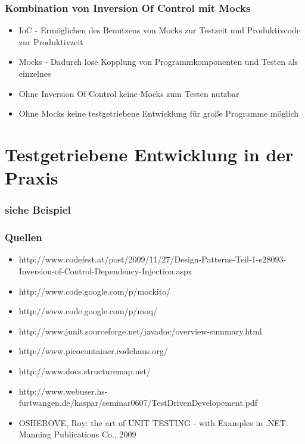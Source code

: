 \documentclass{beamer}
\begin{document}
\begin{frame}
\frametitle{Kombination von Inversion Of Control mit Mocks}
\begin{itemize}
\item IoC - Ermöglichen des Benutzens von Mocks zur Testzeit und Produktivcode zur Produktivzeit
\item Mocks - Dadurch lose Kopplung von Programmkomponenten und Testen als einzelnes\\
\item Ohne Inversion Of Control keine Mocks zum Testen nutzbar
\item Ohne Mocks keine testgetriebene Entwicklung für große Programme möglich
\end{itemize}
\end{frame}

\section{Testgetriebene Entwicklung in der Praxis}
\begin{frame}
\frametitle{siehe Beispiel}
\end{frame}

\begin{appendix}
\begin{frame}
\frametitle{Quellen}
\begin{itemize}
\item http://www.codefest.at/post/2009/11/27/Design-Patterns-Teil-1-e28093-Inversion-of-Control-Dependency-Injection.aspx
\item http://www.code.google.com/p/mockito/
\item http://www.code.google.com/p/moq/
\item http://www.junit.sourceforge.net/javadoc/overview-summary.html
\item http://www.picocontainer.codehaus.org/
\item http://www.docs.structuremap.net/
\item http://www.webuser.hs-furtwangen.de/kaspar/seminar0607/TestDrivenDevelopement.pdf
\item OSHEROVE, Roy: the art of UNIT TESTING - with Examples in .NET. Manning Publications Co., 2009
\end{itemize}
\end{frame}
\end{appendix}
\end{document}
